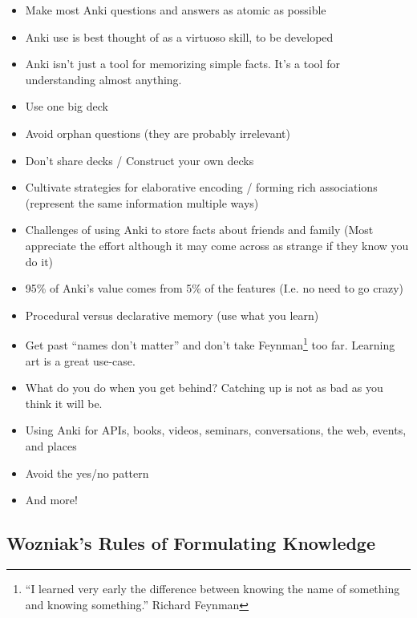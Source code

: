 \documentclass[]{tufte-handout}
\begin{document}
\begin{itemize}
	\item Make most Anki questions and answers as atomic as possible
	\item Anki use is best thought of as a virtuoso skill, to be developed
	\item Anki isn't just a tool for memorizing simple facts. It's a tool for understanding almost anything.
	\item Use one big deck
	\item Avoid orphan questions (they are probably irrelevant)
	\item Don't share decks / Construct your own decks
	\item Cultivate strategies for elaborative encoding / forming rich associations (represent the same information multiple ways)
	\item Challenges of using Anki to store facts about friends and family (Most appreciate the effort although it may come across as strange if they know you do it)
	\item 95\% of Anki's value comes from 5\% of the features (I.e. no need to go crazy)
	\item Procedural versus declarative memory (use what you learn)
	\item Get past ``names don't matter'' and don't take Feynman\footnote{``I learned very early the difference between knowing the name of something and knowing something.'' Richard Feynman} too far. Learning art is a great use-case.
	\item What do you do when you get behind? Catching up is not as bad as you think it will be.
	\item Using Anki for APIs, books, videos, seminars, conversations, the web, events, and places
	\item Avoid the yes/no pattern
	\item And more!
\end{itemize}



\subsection{Wozniak's Rules of Formulating Knowledge\cite{wozniak}}
\end{document}
